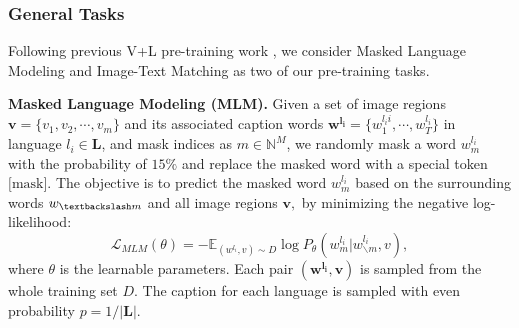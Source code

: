 \documentclass[final]{cvpr}
\newcommand{\head}[1]{\noindent\textbf{#1}}
\begin{document}
\subsubsection{General Tasks}
Following previous V+L pre-training work \cite{UNITER, unicodervl, vilbert, su2020vlbert}, we consider Masked Language Modeling and Image-Text Matching as two of our pre-training tasks.

\vspace{5pt}
\head{Masked Language Modeling (MLM).}
 Given a set of image regions $\boldsymbol{v} = \{v_1, v_2, \cdots, v_m\}$ and its associated caption words $\boldsymbol{w^{l_i}} = \{w^{l_ii}_1, \cdots, w^{l_i}_{T}\}$ in language $l_i \in \boldsymbol{L}$, and mask indices as $m \in \mathbb{N}^M$, we randomly mask a word $w^{l_i}_m$ with the probability of $15\%$ and replace the masked word with a special token $\text{[mask]}$. The objective is to predict the masked word $w^{l_i}_m$ based on the surrounding words $w_{\textbackslash m}$ and all image regions $\boldsymbol{v},$ by minimizing the negative log-likelihood: 
\begin{equation*}
    \mathcal{L}_{MLM}(\theta) = - \mathbb{E}_{(w^{l_i}, v)\sim D} \log{P_{\theta}(w^{l_i}_m|w^{l_i}_{\backslash m},v)},
\end{equation*}
where $\theta$ is the learnable parameters. Each pair $(\boldsymbol{w^{l_i}}, \boldsymbol{v})$ is sampled from the whole training set $D$. The caption for each language is sampled with even probability $p = 1/|\boldsymbol{L}|$.
\end{document}
